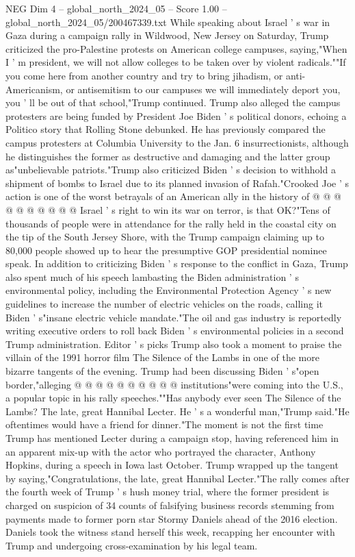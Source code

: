 \begin{textsample}{NEG Dim 4 – global\_north\_2024\_05 – Score 1.00 – global\_north\_2024\_05/200467339.txt}  \label{ex:f4_neg_116}
While speaking about Israel ' s war in Gaza during a campaign rally in Wildwood, New Jersey on Saturday, Trump criticized the pro-Palestine protests on American college campuses, saying,"When I ' m president, we will not allow colleges to be taken over by violent radicals.""If you come here from another country and try to bring jihadism, or anti-Americanism, or antisemitism to our campuses we will immediately deport you, you ' ll be out of that school,"Trump continued.
Trump also alleged the campus protesters are being funded by President Joe Biden ' s political donors, echoing a Politico story that Rolling Stone debunked.
He has previously compared the campus protesters at Columbia University to the Jan. 6 insurrectionists, although he distinguishes the former as destructive and damaging and the latter group as"unbelievable patriots."Trump also criticized Biden ' s decision to withhold a shipment of bombs to Israel due to its planned invasion of Rafah."Crooked Joe ' s action is one of the worst betrayals of an American ally in the history of @ @ @ @ @ @ @ @ @ @ Israel ' s right to win its war on terror, is that OK?"Tens of thousands of people were in attendance for the rally held in the coastal city on the tip of the South Jersey Shore, with the Trump campaign claiming up to 80,000 people showed up to hear the presumptive GOP presidential nominee speak.
In addition to criticizing Biden ' s response to the conflict in Gaza, Trump also spent much of his speech lambasting the Biden administration ' s environmental policy, including the Environmental Protection Agency ' s new guidelines to increase the number of electric vehicles on the roads, calling it Biden ' s"insane electric vehicle mandate."The oil and gas industry is reportedly writing executive orders to roll back Biden ' s environmental policies in a second Trump administration.
Editor ' s picks Trump also took a moment to praise the villain of the 1991 horror film The Silence of the Lambs in one of the more bizarre tangents of the evening.
Trump had been discussing Biden ' s"open border,"alleging @ @ @ @ @ @ @ @ @ @ institutions"were coming into the U.S., a popular topic in his rally speeches.""Has anybody ever seen The Silence of the Lambs?
The late, great Hannibal Lecter.
He ' s a wonderful man,"Trump said."He oftentimes would have a friend for dinner."The moment is not the first time Trump has mentioned Lecter during a campaign stop, having referenced him in an apparent mix-up with the actor who portrayed the character, Anthony Hopkins, during a speech in Iowa last October.
Trump wrapped up the tangent by saying,"Congratulations, the late, great Hannibal Lecter."The rally comes after the fourth week of Trump ' s hush money trial, where the former president is charged on suspicion of 34 counts of falsifying business records stemming from payments made to former porn star Stormy Daniels ahead of the 2016 election.
Daniels took the witness stand herself this week, recapping her encounter with Trump and undergoing cross-examination by his legal team.

\end{textsample}
